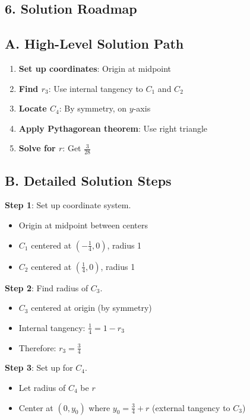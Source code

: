 \documentclass[11pt]{article}
\begin{document}
\begin{roadmapbox}
\section*{6. Solution Roadmap}

\subsection*{A. High-Level Solution Path}
\begin{enumerate}[leftmargin=*]
    \item \textbf{Set up coordinates}: Origin at midpoint
    \item \textbf{Find $r_3$}: Use internal tangency to $C_1$ and $C_2$
    \item \textbf{Locate $C_4$}: By symmetry, on $y$-axis
    \item \textbf{Apply Pythagorean theorem}: Use right triangle
    \item \textbf{Solve for $r$}: Get $\frac{3}{28}$
\end{enumerate}

\subsection*{B. Detailed Solution Steps}

\textbf{Step 1}: Set up coordinate system.
\begin{itemize}
    \item Origin at midpoint between centers
    \item $C_1$ centered at $(-\frac{1}{4}, 0)$, radius 1
    \item $C_2$ centered at $(\frac{1}{4}, 0)$, radius 1
\end{itemize}

\textbf{Step 2}: Find radius of $C_3$.
\begin{itemize}
    \item $C_3$ centered at origin (by symmetry)
    \item Internal tangency: $\frac{1}{4} = 1 - r_3$
    \item Therefore: $r_3 = \frac{3}{4}$
\end{itemize}

\textbf{Step 3}: Set up for $C_4$.
\begin{itemize}
    \item Let radius of $C_4$ be $r$
    \item Center at $(0, y_0)$ where $y_0 = \frac{3}{4} + r$ (external tangency to $C_3$)
\end{itemize}


\end{roadmapbox}
\end{document}

